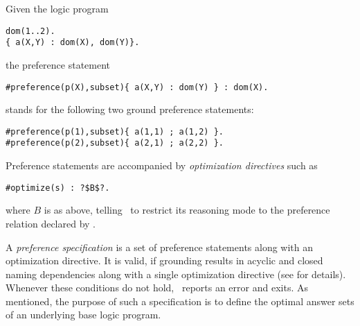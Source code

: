 \begin{example}
\label{asprin:example2}
Given the logic program 
\begin{lstlisting}[numbers=none]
dom(1..2).
{ a(X,Y) : dom(X), dom(Y)}.
\end{lstlisting}
the preference statement 
\begin{lstlisting}[numbers=none]
#preference(p(X),subset){ a(X,Y) : dom(Y) } : dom(X).
\end{lstlisting}
stands for the following two ground preference statements:
\begin{lstlisting}[numbers=none]
#preference(p(1),subset){ a(1,1) ; a(1,2) }.
#preference(p(2),subset){ a(2,1) ; a(2,2) }.
\end{lstlisting}
\end{example}

Preference statements are accompanied by 
\emph{optimization directives} such as
\begin{lstlisting}[numbers=none,escapechar=?]
#optimize(s) : ?$B$?.
\end{lstlisting}
where $B$ is as above, 
telling \asprin\ to restrict its reasoning mode to the preference relation declared by .
% 

A \emph{preference specification} is a set of preference statements along with an optimization directive.
It is valid, if grounding results in acyclic and closed naming dependencies
along with a single optimization directive
(see \cite{brderosc15a} for details).
Whenever these conditions do not hold, \asprin\ reports an error and exits.
%
As mentioned,
the purpose of such a specification is to define the optimal answer sets of an underlying base logic program.

